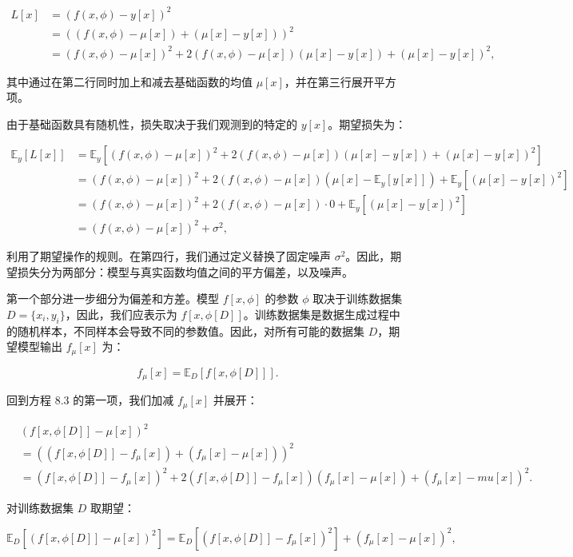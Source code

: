 \begin{align}
L[x] &= (f(x, \phi) - y[x])^2 \\
&= ((f(x, \phi) - \mu[x]) + (\mu[x] - y[x]))^2 \\
&= (f(x, \phi) - \mu[x])^2 + 2(f(x, \phi) - \mu[x])(\mu[x] - y[x]) + (\mu[x] - y[x])^2, \tag{8.2}
\end{align} 


其中通过在第二行同时加上和减去基础函数的均值 \(\mu[x]\)，并在第三行展开平方项。

由于基础函数具有随机性，损失取决于我们观测到的特定的 \(y[x]\)。期望损失为：

\begin{align}
\mathbb{E}_y[L[x]] &= \mathbb{E}_y[(f(x, \phi) - \mu[x])^2 + 2(f(x, \phi) - \mu[x])(\mu[x] - y[x]) + (\mu[x] - y[x])^2] \\
&= (f(x, \phi) - \mu[x])^2 + 2(f(x, \phi) - \mu[x])(\mu[x] - \mathbb{E}_y[y[x]]) + \mathbb{E}_y[(\mu[x] - y[x])^2] \\
&= (f(x, \phi) - \mu[x])^2 + 2(f(x, \phi) - \mu[x]) \cdot 0 + \mathbb{E}_y[(\mu[x] - y[x])^2] \\
&= (f(x, \phi) - \mu[x])^2 + \sigma^2, \tag{8.3}
\end{align} 


利用了期望操作的规则。在第四行，我们通过定义替换了固定噪声 \(\sigma^2\)。因此，期望损失分为两部分：模型与真实函数均值之间的平方偏差，以及噪声。

第一个部分进一步细分为偏差和方差。模型 \(f[x, \phi]\) 的参数 \(\phi\) 取决于训练数据集 \(D = \{x_i, y_i\}\)，因此，我们应表示为 \(f[x, \phi[D]]\)。训练数据集是数据生成过程中的随机样本，不同样本会导致不同的参数值。因此，对所有可能的数据集 \(D\)，期望模型输出 \(f_\mu[x]\) 为：

\[
f_\mu[x] = \mathbb{E}_D[f[x, \phi[D]]].\tag{8.4}
\]

回到方程 8.3 的第一项，我们加减 \(f_\mu[x]\) 并展开：


\begin{align}
&(f[x, \phi[D]] - \mu[x])^2 \\
&= ((f[x, \phi[D]] - f_\mu[x]) + (f_\mu[x] - \mu[x]))^2 \\
&= (f[x, \phi[D]] - f_\mu[x])^2 + 2(f[x, \phi[D]] - f_\mu[x])(f_\mu[x] - \mu[x]) + (f_\mu[x] - mu[x])^2. \tag{8.5}
\end{align} 


对训练数据集 \(D\) 取期望：

\[
\mathbb{E}_D [(f[x, \phi[D]] - \mu[x])^2] = \mathbb{E}_D [(f[x, \phi[D]] - f_\mu[x])^2] + (f_\mu[x] - \mu[x])^2, \tag{8.6}
\]

